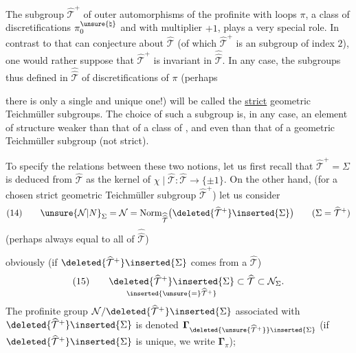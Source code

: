The subgroup $\widehat{\mathcal{T}}^{+}$ of outer automorphisms of the
profinite  with loops $\pi$,
 a class of discretifications
$\pi_0^{\unsure{\natural}}$ and with multiplier $+1$, plays a very special role.
In contrast to that  can conjecture about $\widehat{\mathcal{T}}$
(of which $\widehat{\mathcal{T}}^{+}$ is an  subgroup of index $2$),
one would rather suppose that $\widehat{\mathcal{T}}^{+}$ is invariant in
$\widehat{\widehat{\mathcal{T}}}$. In any case,
the subgroups thus defined in $\widehat{\widehat{\mathcal{T}}}$
  of discretifications of $\pi$
 (perhaps



there is only a single and unique one!) will be called the \uline{strict} geometric Teichmüller subgroups. The choice of such a subgroup  is, in any case, an element of structure  weaker than that of a class of , and even than that of a geometric Teichmüller subgroup (not strict).

To specify the relations between these two notions, let us first recall that $\widehat{\mathcal{T}}^{+}=\Sigma$ is deduced from $\widehat{\mathcal{T}}$ as the kernel of $\chi\mid\widehat{\mathcal{T}}:\widehat{\mathcal{T}}\longrightarrow\{\pm1\}$. On the other hand,  (for a chosen strict geometric Teichmüller subgroup $\widehat{\mathcal{T}}^{+}$) let us consider
\[
(14)\qquad
\unsure{\mathcal{N}|N}_{\Sigma}=\mathcal{N}
=\operatorname{Norm}_{\widehat{\widehat{\mathcal{T}}}}
\bigl(\deleted{\widehat{\mathcal{T}}^{+}}\inserted{\Sigma}\bigr)
\qquad (\Sigma=\widehat{\mathcal{T}}^{+})
\]
(perhaps always equal to all of $\widehat{\widehat{\mathcal{T}}}$)

obviously (if $\deleted{\widehat{\mathcal{T}}^{+}}\inserted{\Sigma}$ comes from a $\widehat{\mathcal{T}}$)
\[
(15)\qquad
\underset{\inserted{\unsure{=}\widehat{\mathcal{T}}^{+}}}
{\deleted{\widehat{\mathcal{T}}^{+}}\inserted{\Sigma}}
\subset\widehat{\mathcal{T}}\subset\mathcal{N}_{\Sigma}.
\]
The profinite group $\mathcal{N}/\deleted{\widehat{\mathcal{T}}^{+}}\inserted{\Sigma}$
 associated with 
$\deleted{\widehat{\mathcal{T}}^{+}}\inserted{\Sigma}$ is denoted
$\boldsymbol{\Gamma}_{\deleted{\unsure{\widehat{\mathcal{T}}^{+}}}\inserted{\Sigma}}$
 
(if $\deleted{\widehat{\mathcal{T}}^{+}}\inserted{\Sigma}$ is unique, we write $\boldsymbol{\Gamma}_{\pi}$);

